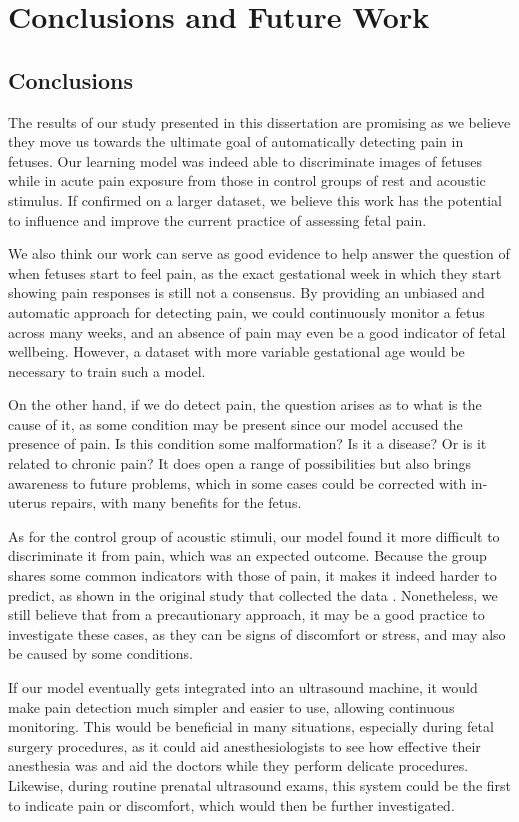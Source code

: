 \chapter{Conclusions and Future Work}

\section{Conclusions}

The results of our study presented in this dissertation are promising as we believe they move us towards the ultimate goal of automatically detecting pain in fetuses. Our learning model was indeed able to discriminate images of fetuses while in acute pain exposure from those in control groups of rest and acoustic stimulus. If confirmed on a larger dataset, we believe this work has the potential to influence and improve the current practice of assessing fetal pain.

We also think our work can serve as good evidence to help answer the question of when fetuses start to feel pain, as the exact gestational week in which they start showing pain responses is still not a consensus. By providing an unbiased and automatic approach for detecting pain, we could continuously monitor a fetus across many weeks, and an absence of pain may even be a good indicator of fetal wellbeing. However, a dataset with more variable gestational age would be necessary to train such a model.

On the other hand, if we do detect pain, the question arises as to what is the cause of it, as some condition may be present since our model accused the presence of pain. Is this condition some malformation? Is it a disease? Or is it related to chronic pain? It does open a range of possibilities but also brings awareness to future problems, which in some cases could be corrected with in-uterus repairs, with many benefits for the fetus.

As for the control group of acoustic stimuli, our model found it more difficult to discriminate it from pain, which was an expected outcome.  Because the group shares some common indicators with those of pain, it makes it indeed harder to predict, as shown in the original study that collected the data \citep{bernardes2018feasibility}. Nonetheless, we still believe that from a precautionary approach, it may be a good practice to investigate these cases, as they can be signs of discomfort or stress, and may also be caused by some conditions.

If our model eventually gets integrated into an ultrasound machine, it would make pain detection much simpler and easier to use, allowing continuous monitoring. This would be beneficial in many situations, especially during fetal surgery procedures, as it could aid anesthesiologists to see how effective their anesthesia was and aid the doctors while they perform delicate procedures. Likewise, during routine prenatal ultrasound exams, this system could be the first to indicate pain or discomfort, which would then be further investigated.

